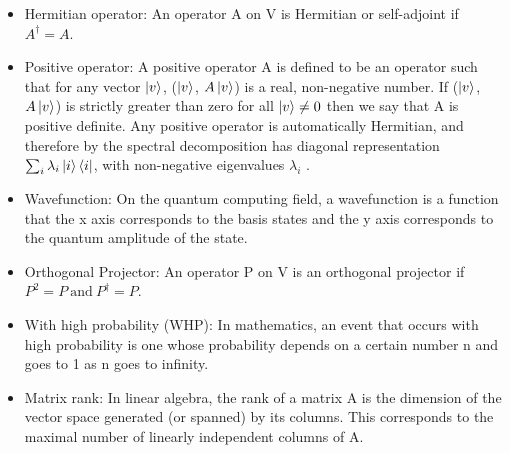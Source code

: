 \documentclass{article}
\begin{document}
\begin{itemize}
			\item Hermitian operator: An operator A on V is Hermitian or self-adjoint if $A^\dag = A$.

			\item Positive operator: A positive operator A is deﬁned to be an operator such that for any vector $\ket{v}$, ($\ket{v}$, $A\ket{v}$) is a real, non-negative number. If ($\ket{v}$, $A\ket{v}$) is strictly greater than zero for all $\ket{v} \neq 0$ then we say that A is positive deﬁnite. Any positive operator is automatically Hermitian, and therefore by the spectral decomposition has diagonal representation $\sum_i \lambda_i \ket{i}\bra{i}$, with non-negative eigenvalues $\lambda_i$ . \cite{quantccompquantinfo}
			
			\item Wavefunction: On the quantum computing field, a wavefunction is a function that the x axis corresponds to the basis states and the y axis corresponds to the quantum amplitude of the state.
			
			\item Orthogonal Projector: An operator P on V is an orthogonal projector if $P^{2} = P\ \text{and}\ P^\dag = P$. \cite{portugal}

			\item With high probability (WHP): In mathematics, an event that occurs with high probability is one whose probability depends on a certain number n and goes to 1 as n goes to infinity. 
			
			\item Matrix rank: In linear algebra, the rank of a matrix A is the dimension of the vector space generated (or spanned) by its columns. This corresponds to the maximal number of linearly independent columns of A. 
		\end{itemize}
\end{document}
